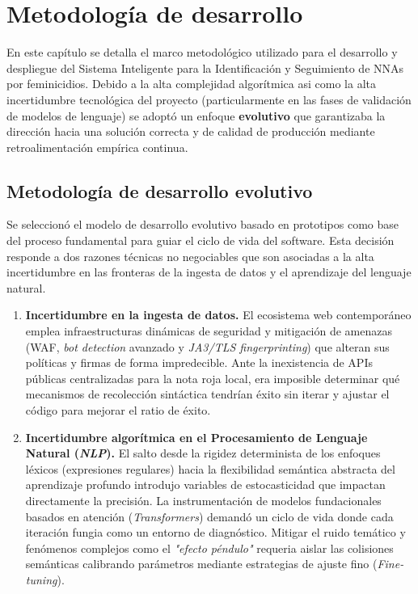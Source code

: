 
\chapter{Metodología de desarrollo}
\label{cap:metodologia}

En este capítulo se detalla el marco metodológico utilizado para el desarrollo y
despliegue del Sistema Inteligente para la Identificación y Seguimiento
de NNAs por feminicidios. Debido a la alta complejidad algorítmica asi como la alta
incertidumbre tecnológica del proyecto (particularmente en las fases de validación
de modelos de lenguaje) se adoptó un enfoque \textbf{evolutivo} que garantizaba
la dirección hacia una solución correcta y de calidad de producción mediante
retroalimentación empírica continua.

\section{Metodología de desarrollo evolutivo}
\label{sec:met_evolutivo}

Se seleccionó el modelo de desarrollo evolutivo basado en prototipos como base del proceso
fundamental para guiar el ciclo de vida del software. Esta decisión responde a dos razones
técnicas no negociables que son asociadas a la alta incertidumbre en las fronteras de la
ingesta de datos y el aprendizaje del lenguaje natural.

\begin{enumerate}
    \item \textbf{Incertidumbre en la ingesta de datos.} El ecosistema web contemporáneo
    emplea infraestructuras dinámicas de seguridad y mitigación de amenazas (WAF, \textit{bot detection} avanzado
    y \textit{JA3/TLS fingerprinting}) que alteran sus políticas y firmas de forma impredecible. Ante la inexistencia
    de APIs públicas centralizadas para la nota roja local, era imposible determinar qué mecanismos de recolección
    sintáctica tendrían éxito sin iterar y ajustar el código para mejorar el ratio de éxito.
    \item \textbf{Incertidumbre algorítmica en el Procesamiento de Lenguaje Natural (\textit{NLP}).} El salto desde la rigidez
    determinista de los enfoques léxicos (expresiones regulares) hacia la flexibilidad semántica abstracta del aprendizaje profundo
    introdujo variables de estocasticidad que impactan directamente la precisión. La instrumentación de modelos fundacionales
    basados en atención (\textit{Transformers}) demandó un ciclo de vida donde cada iteración fungia como un entorno de diagnóstico.
    Mitigar el ruido temático y fenómenos complejos como el \textit{"efecto péndulo"} requeria aislar las colisiones semánticas
    calibrando parámetros mediante estrategias de ajuste fino (\textit{Fine-tuning}).
\end{enumerate}

